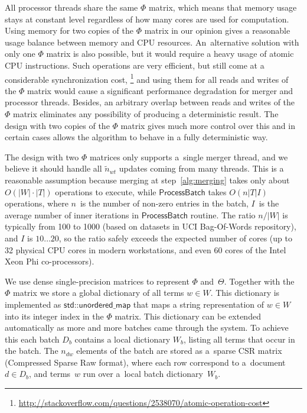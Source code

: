 \documentclass{acm_proc_article-sp}
\newcommand{\kw}[1]{\textsf{#1}}
\begin{document}
All processor threads share the same $\Phi$ matrix,
which means that memory usage stays at constant level regardless of how many cores are used for computation.
Using memory for two copies of the $\Phi$ matrix in our opinion gives a reasonable usage balance between memory and CPU resources.
An~alternative solution with only one $\Phi$ matrix is also possible, but it would require a heavy usage of atomic CPU instructions.
Such operations are very efficient, but still come at a considerable synchronization cost,%
\footnote{\url{http://stackoverflow.com/questions/2538070/atomic-operation-cost}}
and using them for all reads and writes of the $\Phi$ matrix would cause a significant performance degradation for merger and processor threads.
Besides, an arbitrary overlap between reads and writes of the $\Phi$ matrix eliminates any possibility of producing a deterministic result.
The design with two copies of the $\Phi$ matrix gives much more control over this
and in certain cases allows the algorithm to behave in a fully deterministic way.

The design with two $\Phi$ matrices only supports a~single merger thread,
and we believe it should handle all $\tilde n_{wt}$ updates coming from many threads.
This is a reasonable assumption because
merging at step~\ref{alg:merging} takes only about $O(|W|\cdot|T|)$ operations to execute, while
$\kw{ProcessBatch}$ takes $O(n |T| I)$ operations,
where
$n$~is the number of non-zero entries in the batch,
$I$~is the average number of inner iterations in $\kw{ProcessBatch}$ routine.
The ratio $n / |W|$ is typically from 100 to 1000 (based on datasets in UCI Bag-Of-Words repository),
and $I$ is $10 \dots 20$, so the ratio safely exceeds the expected number of cores
(up to 32 physical CPU cores in modern workstations, and even 60 cores of the Intel Xeon Phi co-processors).

We use dense single-precision matrices to represent $\Phi$ and~$\Theta$.
Together with the $\Phi$ matrix we store a global dictionary of all terms ${w \in W}$.
This dictionary is implemented as $\kw{std::unordered\_map}$ that maps a string representation of ${w \in W}$
into its integer index in the $\Phi$ matrix.
This dictionary can be extended automatically as more and more batches came through the system.
To achieve this each batch $D_b$ contains a local dictionary $W_b$, listing all terms that occur in the batch.
The $n_{dw}$ elements of the batch are stored as a~sparse CSR matrix (Compressed Sparse Raw format),
where each row correspond to a~document ${d \in D_b}$,
and terms~$w$ run over a~local batch dictionary~$W_b$.
\end{document}
